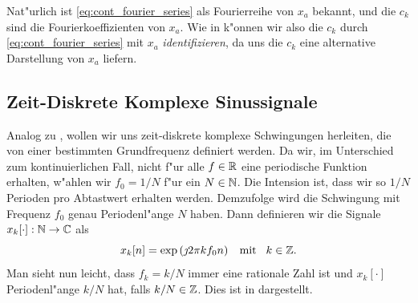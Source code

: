 Nat"urlich ist \eqref{eq:cont_fourier_series} als Fourierreihe von $x_a$ bekannt, und die $c_k$ sind die Fourierkoeffizienten von $x_a$.
Wie in  k"onnen wir also die $c_k$ durch \eqref{eq:cont_fourier_series} mit $x_a$ \emph{identifizieren}, da uns die $c_k$ eine alternative Darstellung von $x_a$ liefern.
%
\subsection{Zeit-Diskrete Komplexe Sinussignale}
%
Analog zu , wollen wir uns zeit-diskrete komplexe Schwingungen herleiten, die von einer bestimmten Grundfrequenz definiert werden.
Da wir, im Unterschied zum kontinuierlichen Fall, nicht f"ur alle $f \in \mathbb{R}$ eine periodische Funktion erhalten, w"ahlen wir $f_0 = 1/N$ f"ur ein $N \in \mathbb{N}$. 
Die Intension ist, dass wir so $1/N$ Perioden pro Abtastwert erhalten werden. 
Demzufolge wird die Schwingung mit Frequenz $f_0$ genau Periodenl"ange $N$ haben.
Dann definieren wir die Signale $x_k[\cdot]: \mathbb{N} \rightarrow \mathbb{C}$ als
%
\begin{equation}\label{eq:disc_harms_comp}
    x_k[n] = \exp\left(
        \jmath 2 \pi k f_0 n
    \right) {\hspace{3mm} \text{mit} \hspace{3mm}} k \in \mathbb{Z}.
\end{equation}
%
Man sieht nun leicht, dass $f_k = k/N$ immer eine rationale Zahl ist und $x_k[\cdot]$ Periodenl"ange $k/N$ hat, falls $k/N \in \mathbb{Z}$.
Dies ist in  dargestellt.

